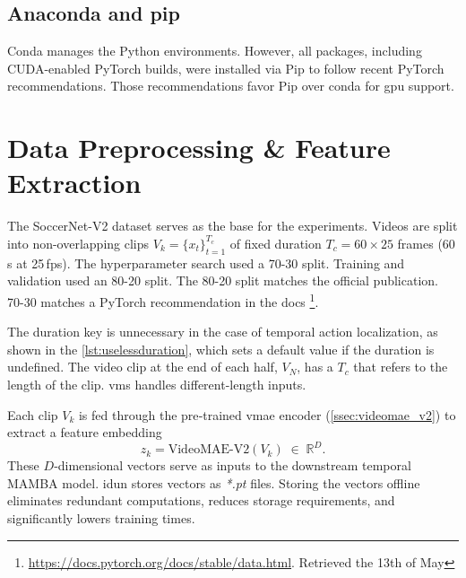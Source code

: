 \subsection{Anaconda and pip}
\label{ssec:conda_pip}
Conda manages the Python environments. However, all packages, including CUDA-enabled PyTorch builds, were installed via Pip to follow recent PyTorch recommendations. Those recommendations favor Pip over conda for \acrshort{gpu} support.

\section{Data Preprocessing \& Feature Extraction}
\label{sec:preprocessing}

The SoccerNet-V2 dataset \cite{deliege_soccernet-v2_dataset_2021} serves as the base for the experiments. Videos are split into non-overlapping clips $V_k=\{x_t\}_{t=1}^{T_c}$ of fixed duration $T_c=60\!\times\!25$ frames (60\,s at 25\,fps). The hyperparameter search used a 70-30 split. Training and validation used an 80-20 split. The 80-20 split matches the official publication. 70-30 matches a PyTorch recommendation in the docs \footnote{\url{https://docs.pytorch.org/docs/stable/data.html}. Retrieved the 13th of May}.



The duration key is unnecessary in the case of temporal action localization, as shown in the \autoref{lst:uselessduration}, which sets a default value if the duration is undefined. The video clip at the end of each half, $V_{N}$, has a $T_c$ that refers to the length of the clip. \acrfull{vms} handles different-length inputs. 



Each clip $V_k$ is fed through the pre‐trained \acrshort{vmae} encoder (\cref{ssec:videomae_v2}) to extract a feature embedding
\[
z_k = \mathrm{VideoMAE\text{-}V2}(V_k)\;\in\;\mathbb{R}^D.
\]
These $D$‐dimensional vectors serve as inputs to the downstream temporal MAMBA model. \acrshort{idun} stores vectors as \textit{*.pt} files. Storing the vectors offline eliminates redundant computations, reduces storage requirements, and significantly lowers training times. 

